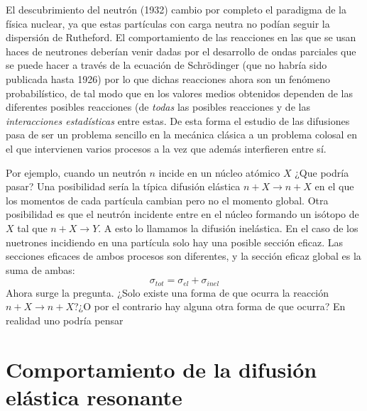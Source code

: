 \documentclass[fleqn,10pt]{SelfArx} %
\begin{document}
El descubrimiento del neutrón (1932) cambio por completo el paradigma de la física nuclear, ya que estas partículas con carga neutra no podían seguir la dispersión de Rutheford. El comportamiento de las reacciones en las que se usan haces de neutrones deberían venir dadas por el desarrollo de ondas parciales que se puede hacer a través de la ecuación de Schrödinger (que no habría sido publicada hasta 1926) por lo que dichas reacciones ahora son un fenómeno probabilístico, de tal modo que en los valores medios obtenidos dependen de las diferentes posibles reacciones (de \textit{todas} las posibles reacciones y de las \textit{interacciones estadísticas} entre estas. De esta forma el estudio de las difusiones pasa de ser un problema sencillo en la mecánica clásica a un problema colosal en el que intervienen varios procesos a la vez que además interfieren entre sí.

Por ejemplo, cuando un neutrón $n$ incide en un núcleo atómico $X$ ¿Que podría pasar? Una posibilidad sería la típica difusión elástica $n+X\rightarrow  n+X$ en el que los momentos de cada partícula cambian pero no el momento global. Otra posibilidad es que el neutrón incidente entre en el núcleo formando un isótopo de $X$ tal que $n+X\rightarrow Y$. A esto lo llamamos la difusión inelástica. En el caso de los nuetrones incidiendo en una partícula solo hay una posible sección eficaz. Las secciones eficaces de ambos procesos son diferentes, y la sección eficaz global es la suma de ambas:
\begin{equation}
	\sigma_{tot} = \sigma_{el} + \sigma_{inel}
\end{equation}
Ahora surge la pregunta. ¿Solo existe una forma de que ocurra la reacción $n+X\rightarrow n +X$?¿O por el contrario hay alguna otra forma de que ocurra? En realidad uno podría pensar 



\section{Comportamiento de la difusión elástica resonante} 



\newpage
{}



\end{document}
